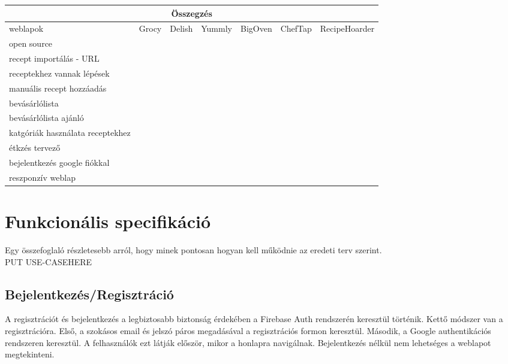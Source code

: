 \documentclass[12pt]{report}
\theoremstyle{definition}
\begin{document}
\noindent
\begin{tabular}{p{3cm} | c c c c c | c @{}}
	\multicolumn{7}{c}{Összegzés}                                                                   \\ \midrule
	weblapok                         & Grocy  & Delish & Yummly & BigOven & ChefTap & RecipeHoarder \\ \cmidrule[2pt](r){2-7}
	open source                      & \cmark & \xmark & \xmark & \xmark  & \xmark  & \xmark        \\\cmidrule(r){2-7}
	recept importálás - URL          & \xmark & \xmark & \xmark & \cmark  & \cmark  & \cmark        \\ \cmidrule(r){2-7}
	receptekhez vannak lépések       & \xmark & \cmark & \cmark & \xmark  & \cmark  & \cmark        \\ \cmidrule(r){2-7}
	manuális recept hozzáadás        & \cmark & \xmark & \xmark & \cmark  & \cmark  & \cmark        \\ \cmidrule(r){2-7}
	bevásárlólista                   & \cmark & \xmark & \cmark & \cmark  & \cmark  & \cmark        \\ \cmidrule(r){2-7}
	bevásárlólista ajánló            & \cmark & \xmark & \xmark & \xmark  & \xmark  & \cmark        \\ \cmidrule(r){2-7}
	katgóriák használata receptekhez & \xmark & \cmark & \cmark & \xmark  & \cmark  & \cmark        \\ \cmidrule(r){2-7}
	étkzés tervező                   & \cmark & \xmark & \cmark & \xmark  & \xmark  & \xmark        \\ \cmidrule(r){2-7}
	bejelentkezés google fiókkal     & \xmark & \cmark & \cmark & \cmark  & \xmark  & \cmark        \\ \cmidrule(r){2-7}
	reszponzív weblap                & \cmark & \xmark & \xmark & \xmark  & \xmark  & \cmark        \\ \bottomrule
\end{tabular}

\chapter{Funkcionális specifikáció}
Egy összefoglaló részletesebb arról, hogy minek pontosan hogyan kell működnie az eredeti terv szerint. \\

PUT USE-CASEHERE

\section{Bejelentkezés/Regisztráció}
A regisztrációt és bejelentkezés a legbiztosabb biztonság érdekében a Firebase Auth rendszerén keresztül történik. Kettő módszer van a regisztrációra. Első, a szokásos email és jelszó páros megadásával a regisztrációs formon keresztül. Második, a Google authentikációs rendszeren keresztül. A felhasználók ezt látják először, mikor a honlapra navigálnak. Bejelentkezés nélkül nem lehetséges a weblapot megtekinteni.
\end{document}
